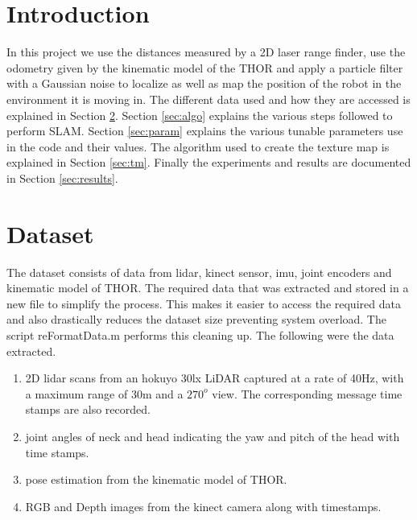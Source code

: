 \documentclass[fleqn,10pt]{SelfArx} %
\begin{document}
\flushbottom %

\maketitle %

\tableofcontents %

\thispagestyle{empty} %

\section{Introduction}
In this project we use the distances measured by a 2D laser range finder, use the odometry given by the kinematic model of the THOR and apply a particle filter with a Gaussian noise to localize as well as map the position of the robot in the environment it is moving in. The different data used and how they are accessed is explained in Section \ref{sec:pprocessing}. Section \ref{sec:algo} explains the various steps followed to perform SLAM. Section \ref{sec:param} explains the various tunable parameters use in the code and their values. The algorithm used to create the texture map is explained in Section \ref{sec:tm}. Finally the experiments and results are documented in Section \ref{sec:results}.

\section{Dataset}
\label{sec:pprocessing}
The dataset consists of data from lidar, kinect sensor, imu, joint encoders and kinematic model of THOR. The required data that was extracted and stored in a new file to simplify the process. This makes it easier to access the required data and also drastically reduces the dataset size preventing system overload. The script reFormatData.m performs this cleaning up. The following were the data extracted.
\begin{enumerate}
\item 2D lidar scans from an hokuyo 30lx LiDAR captured at a rate of 40Hz, with a maximum range of 30m and a $270^o$ view. The corresponding message time stamps are also recorded. 
\item joint angles of neck and head indicating the yaw and pitch of the head with time stamps.
\item pose estimation from the kinematic model of THOR.
\item RGB and Depth images from the kinect camera along with timestamps.
\end{enumerate}
\end{document}
